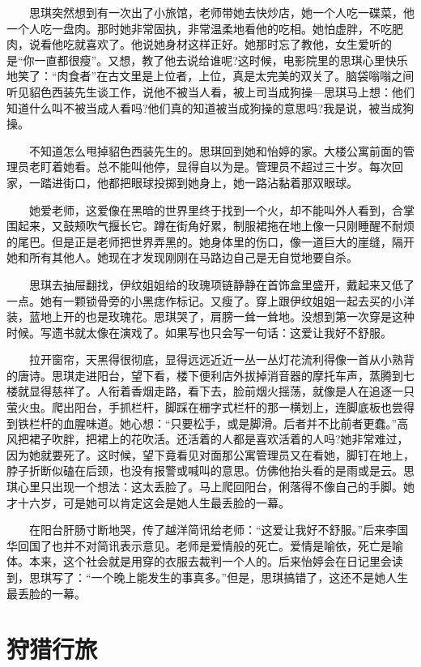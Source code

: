 \documentclass[12pt,UTF8]{ctexbook}
\begin{document}
　　思琪突然想到有一次出了小旅馆，老师带她去快炒店，她一个人吃一碟菜，他一个人吃一盘肉。那时她非常固执，非常温柔地看他的吃相。她怕虚胖，不吃肥肉，说看他吃就喜欢了。他说她身材这样正好。她那时忘了教他，女生爱听的是\enquote{你一直都很瘦}。又想，教了他去说给谁呢?这时候，电影院里的思琪心里快乐地笑了：\enquote{肉食者}在古文里是上位者，上位，真是太完美的双关了。脑袋嗡嗡之间听见貂色西装先生谈工作，说他不被当人看，被上司当成狗操---思琪马上想：他们知道什么叫不被当成人看吗?他们真的知道被当成狗操的意思吗?我是说，被当成狗操。

　　不知道怎么甩掉貂色西装先生的。思琪回到她和怡婷的家。大楼公寓前面的管理员老盯着她看。总不能叫他停，显得自以为是。管理员不超过三十岁。每次回家，一踏进街口，他都把眼球投掷到她身上，她一路沾黏着那双眼球。

　　她爱老师，这爱像在黑暗的世界里终于找到一个火，却不能叫外人看到，合掌围起来，又鼓颊吹气揠长它。蹲在街角好累，制服裙拖在地上像一只刚睡醒不耐烦的尾巴。但是正是老师把世界弄黑的。她身体里的伤口，像一道巨大的崖缝，隔开她和所有其他人。她现在才发现刚刚在马路边自己是无自觉地要自杀。

　　思琪去抽屉翻找，伊纹姐姐给的玫瑰项链静静在首饰盒里盛开，戴起来又低了一点。她有一颗锁骨旁的小黑痣作标记。又瘦了。穿上跟伊纹姐姐一起去买的小洋装，蓝地上开的也是玫瑰花。思琪哭了，肩膀一耸一耸地。没想到第一次穿是这种时候。写遗书就太像在演戏了。如果写也只会写一句话：这爱让我好不舒服。

　　拉开窗帘，天黑得很彻底，显得远远近近一丛一丛灯花流利得像一首从小熟背的唐诗。思琪走进阳台，望下看，楼下便利店外拔掉消音器的摩托车声，蒸腾到七楼就显得慈祥了。人衔着香烟走路，看下去，脸前烟火摇荡，就像是人在追逐一只萤火虫。爬出阳台，手抓栏杆，脚踩在栅字式栏杆的那一横划上，连脚底板也尝得到铁栏杆的血腥味道。她心想：\enquote{只要松手，或是脚滑。后者并不比前者更蠢。}高风把裙子吹胖，把裙上的花吹活。还活着的人都是喜欢活着的人吗?她非常难过，因为她就要死了。这时候，望下竟看见对面那公寓管理员又在看她，脚钉在地上，脖子折断似磕在后颈，也没有报警或喊叫的意思。仿佛他抬头看的是雨或是云。思琪心里只出现一个想法：这太丢脸了。马上爬回阳台，俐落得不像自己的手脚。她才十六岁，可是她可以肯定这会是她人生最丢脸的一幕。

　　在阳台肝肠寸断地哭，传了越洋简讯给老师：\enquote{这爱让我好不舒服。}后来李国华回国了也并不对简讯表示意见。老师是爱情般的死亡。爱情是喻依，死亡是喻体。本来，这个社会就是用穿的衣服去裁判一个人的。后来怡婷会在日记里会读到，思琪写了：\enquote{一个晚上能发生的事真多。}但是，思琪搞错了，这还不是她人生最丢脸的一幕。

\hypertarget{ux72e9ux730eux884cux65c5}{%
\section*{狩猎行旅}\label{ux72e9ux730eux884cux65c5}}
\end{document}
